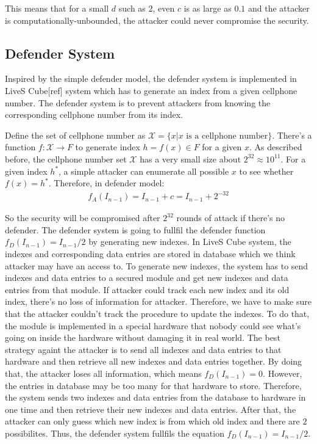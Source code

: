 \documentclass[10pt,a4paper]{article}
\begin{document}
		This means that for a small $d$ such as $2$, even $c$ is as large as
		$0.1$ and the attacker is computationally-unbounded, the attacker
		could never compromise the security.
		
	\subsection{Defender System}\label{sec_ds}
		Inspired by the simple defender model, the defender system is implemented
		in LiveS Cube[ref] system which has to generate an index
		from a given cellphone number. The defender system is to prevent attackers
		from knowing the corresponding cellphone number from its index.
		
		Define the set of cellphone number as $\mathcal X = \{x | \text{$x$ is a cellphone number}\}$.
		There's a function $f: \mathcal X \rightarrow F$ to generate index $h = f(x) \in F$ for
		a given $x$. As described before, the cellphone number set $\mathcal X$ has a very small
		size about $2^{32} \approx 10^{11}$. For a given index $h^*$, a simple attacker
		can enumerate all possible $x$ to see whether $f(x) = h^*$. Therefore, in defender
		model:
		\begin{align*}
			f_A(I_{n-1}) = I_{n-1}+c = I_{n-1}+2^{-32}
		\end{align*}
		
		So the security will be compromised after $2^{32}$ rounds of attack if there's
		no defender. The defender system is going to fullfil the defender
		function $f_D(I_{n-1}) = I_{n-1}/2$ by generating new indexes.
		In LiveS Cube system, the indexes and corresponding data entries are stored
		in database which we think attacker may have an access to. To generate
		new indexes, the system has to send indexes and data entries to a 
		secured module
		and get new indexes and data entries from that module. If attacker
		could track each new index and its old index, there's no loss of information 
		for attacker. Therefore, we have to make sure that the attacker couldn't track
		the procedure to update the indexes.
		To do that, the module is implemented in a special hardware that nobody
		could see what's going on inside the hardware without damaging it in real world.
		The best strategy againt the attacker 
		is to send all indexes and data entries to that hardware and then
		retrieve all new indexes and data entries together. By doing that, the attacker
		loses all information, which means $f_D(I_{n-1}) = 0$. However, the entries
		in database may be too many for that hardware to store. Therefore, the system
		sends two indexes and data entries from the database to hardware in one time and
		then retrieve their new indexes and data entries. After that, the attacker can
		only guess which new index is from which old index and there are $2$ possibilites.
		Thus, the defender system fullfils the equation $f_D(I_{n-1}) = I_{n-1}/2$.
		
\end{document}
